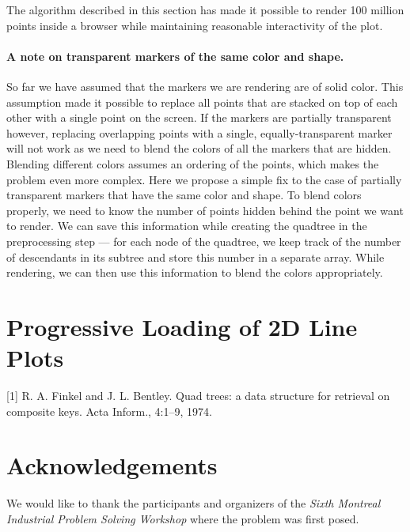 \documentclass[11pt,a4paper]{article}
\begin{document}
The algorithm described in this section has made it possible to render 100 million points inside a browser while maintaining
reasonable interactivity of the plot.



\paragraph{A note on transparent markers of the same color and shape.}

So far we have assumed that the markers we are rendering are of solid color. 
This assumption made it possible to replace all points that are stacked on top of each other 
with a single point on the screen.
If the markers are partially transparent however, replacing overlapping points with a single, equally-transparent marker
will not work as we need to blend the colors of all the markers that are hidden. 
Blending different colors assumes an ordering of the points, which makes the problem even more complex.
Here we propose a simple fix to the case of partially transparent markers that have the same color and shape. 
To blend colors properly, we need to know the number of points hidden behind the point we want to render. 
We can save this information while creating the quadtree in the preprocessing step --- for each 
node of the quadtree, we keep track of the number of descendants in its subtree and 
store this number in a separate array. 
While rendering, we can then use this information to blend the colors appropriately. 




\section{Progressive Loading of 2D Line Plots}



[1] R. A. Finkel and J. L. Bentley. Quad trees: a data structure for retrieval on composite keys. Acta Inform., 4:1–9, 1974.

\vskip2cm

\section*{Acknowledgements}
We would like to thank the participants and organizers of the \emph{Sixth Montreal Industrial Problem Solving Workshop}
where the problem was first posed. 
\end{document}
